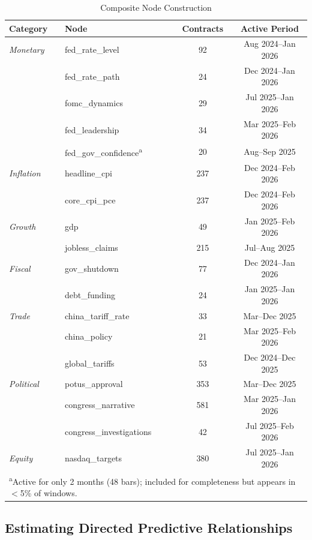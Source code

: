 \documentclass[12pt,letterpaper]{article}
\begin{document}
\begin{table}[H]
\centering
\caption{Composite Node Construction}\label{tab:nodes}
\small
\begin{tabular}{llcc}
\toprule
Category & Node & Contracts & Active Period \\
\midrule
\textit{Monetary} & fed\_rate\_level & 92 & Aug 2024--Jan 2026 \\
 & fed\_rate\_path & 24 & Dec 2024--Jan 2026 \\
 & fomc\_dynamics & 29 & Jul 2025--Jan 2026 \\
 & fed\_leadership & 34 & Mar 2025--Feb 2026 \\
 & fed\_gov\_confidence\textsuperscript{a} & 20 & Aug--Sep 2025 \\
\textit{Inflation} & headline\_cpi & 237 & Dec 2024--Feb 2026 \\
 & core\_cpi\_pce & 237 & Dec 2024--Feb 2026 \\
\textit{Growth} & gdp & 49 & Jan 2025--Feb 2026 \\
 & jobless\_claims & 215 & Jul--Aug 2025 \\
\textit{Fiscal} & gov\_shutdown & 77 & Dec 2024--Jan 2026 \\
 & debt\_funding & 24 & Jan 2025--Jan 2026 \\
\textit{Trade} & china\_tariff\_rate & 33 & Mar--Dec 2025 \\
 & china\_policy & 21 & Mar 2025--Feb 2026 \\
 & global\_tariffs & 53 & Dec 2024--Dec 2025 \\
\textit{Political} & potus\_approval & 353 & Mar--Dec 2025 \\
 & congress\_narrative & 581 & Mar 2025--Jan 2026 \\
 & congress\_investigations & 42 & Jul 2025--Feb 2026 \\
\textit{Equity} & nasdaq\_targets & 380 & Jul 2025--Jan 2026 \\
\bottomrule
\multicolumn{4}{l}{\footnotesize\textsuperscript{a}Active for only 2 months (48 bars); included for completeness but appears in $<$5\% of windows.}
\end{tabular}
\end{table}

\subsection{Estimating Directed Predictive Relationships}
\end{document}
